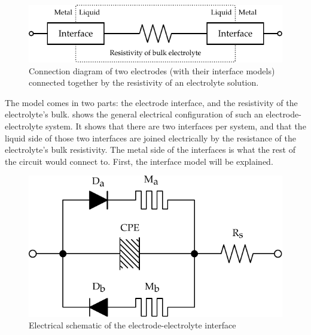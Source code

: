   \begin{figure}
    \centering
    \includegraphics{content/pt2/07-InterfaceModel/graphics/simpleElectrodeElectrolyteModel}
    \caption{\label{fig:pt2-simpleElectrodeElectrolyteModel}Connection diagram of two electrodes (with their interface models) connected together by the resistivity of an electrolyte solution.}
  \end{figure}
  The model comes in two parts: the electrode interface, and the resistivity of the electrolyte's bulk.
   shows the general electrical configuration of such an electrode-electrolyte system.
  It shows that there are two interfaces per system, and that the liquid side of those two interfaces are joined electrically by the resistance of the electrolyte's bulk resistivity.
  The metal side of the interfaces is what the rest of the circuit would connect to.
  First, the interface model will be explained.



  \begin{figure}
    \centering
    \includegraphics{content/pt2/07-InterfaceModel/graphics/interfaceSchematic}
    \caption{\label{fig:pt2-interfaceSchematic}Electrical schematic of the electrode-electrolyte interface}
  \end{figure}

